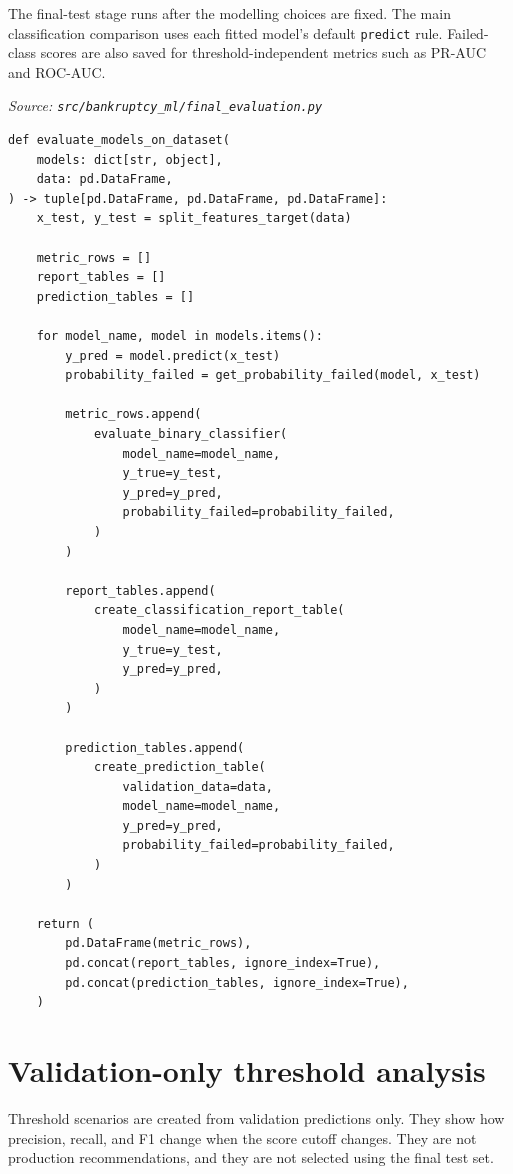 \documentclass[10pt]{article}
\begin{document}
The final-test stage runs after the modelling choices are fixed. The main
classification comparison uses each fitted model's default \texttt{predict}
rule. Failed-class scores are also saved for threshold-independent metrics such
as PR-AUC and ROC-AUC.

\textit{Source: \texttt{src/bankruptcy\_ml/final\_evaluation.py}}

\begin{lstlisting}
def evaluate_models_on_dataset(
    models: dict[str, object],
    data: pd.DataFrame,
) -> tuple[pd.DataFrame, pd.DataFrame, pd.DataFrame]:
    x_test, y_test = split_features_target(data)

    metric_rows = []
    report_tables = []
    prediction_tables = []

    for model_name, model in models.items():
        y_pred = model.predict(x_test)
        probability_failed = get_probability_failed(model, x_test)

        metric_rows.append(
            evaluate_binary_classifier(
                model_name=model_name,
                y_true=y_test,
                y_pred=y_pred,
                probability_failed=probability_failed,
            )
        )

        report_tables.append(
            create_classification_report_table(
                model_name=model_name,
                y_true=y_test,
                y_pred=y_pred,
            )
        )

        prediction_tables.append(
            create_prediction_table(
                validation_data=data,
                model_name=model_name,
                y_pred=y_pred,
                probability_failed=probability_failed,
            )
        )

    return (
        pd.DataFrame(metric_rows),
        pd.concat(report_tables, ignore_index=True),
        pd.concat(prediction_tables, ignore_index=True),
    )
\end{lstlisting}

\section{Validation-only threshold analysis}

Threshold scenarios are created from validation predictions only. They show how
precision, recall, and F1 change when the score cutoff changes. They are not
production recommendations, and they are not selected using the final test set.
\end{document}
